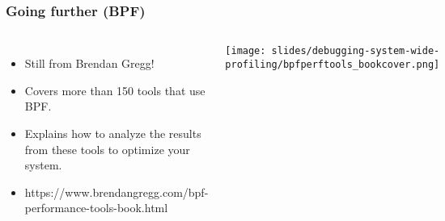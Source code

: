 \begin{frame}[fragile]
  \frametitle{Going further (BPF)}
  \begin{columns}
    \begin{itemize}
    \item Still from Brendan Gregg!
    \item Covers more than 150 tools that use BPF.
    \item Explains how to analyze the results from these tools to optimize
      your system.
    \item https://www.brendangregg.com/bpf-performance-tools-book.html
    \end{itemize}
    \texttt{[image: slides/debugging-system-wide-profiling/bpfperftools\_bookcover.png]}\\ 
  \end{columns}
\end{frame}
